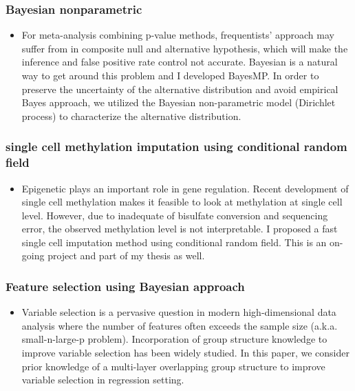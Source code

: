 \documentclass[a4paper, 10pt]{article}
\begin{document}
\subsubsection{Bayesian nonparametric}
\begin{itemize}
\item 
For meta-analysis combining p-value methods, 
frequentists' approach may suffer from in composite null and alternative hypothesis,
which will make the inference and false positive rate control not accurate.
Bayesian is a natural way to get around this problem and I developed BayesMP.
In order to preserve the uncertainty of the alternative distribution and avoid empirical Bayes approach, 
we utilized the Bayesian non-parametric model (Dirichlet process) to characterize the alternative distribution.
\end{itemize}

\subsubsection{single cell methylation imputation using conditional random field}
\begin{itemize}
\item Epigenetic plays an important role in gene regulation. 
Recent development of single cell methylation makes it feasible to look at methylation at single cell level. 
However, due to inadequate of bisulfate conversion and sequencing error, 
the observed methylation level is not interpretable.
I proposed a fast single cell imputation method using conditional random field.
This is an on-going project and part of my thesis as well.
\end{itemize}

\subsubsection{Feature selection using Bayesian approach}
\begin{itemize}
\item 
Variable selection is a pervasive question in modern high-dimensional data analysis where the number
of features often exceeds the sample size (a.k.a. small-n-large-p problem). Incorporation of group structure knowledge
to improve variable selection has been widely studied. In this paper, we consider prior knowledge of a multi-layer
overlapping group structure to improve variable selection in regression setting.
\end{itemize}
\end{document}
